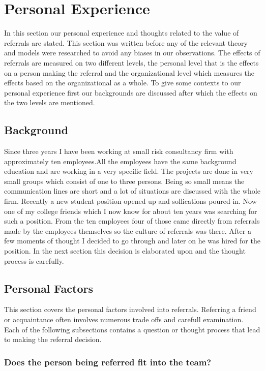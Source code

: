 \documentclass[a4paper, 11pt]{article} %
\begin{document}
\section*{Personal Experience}
In this section our personal experience and thoughts related to the value of referrals are stated. This section was written before any of the relevant theory and models were researched to avoid any biases in our observations. The effects of referrals are measured on two different levels, the personal level that is the effects on a person making the referral and the organizational level which measures the effects based on the organizational as a whole. To give some contexts to our personal experience first our backgrounds are discussed after which the effects on the two levels are mentioned.

\subsection*{Background}

 Since three years I have been working at small risk consultancy firm with approximately ten employees.All the employees have the same background education and are working in a very specific field. The projects are done in very small groups which consist of one to three persons. Being so small means the communication lines are short and a lot of situations are discussed with the whole firm. Recently a new student position opened up and sollications poured in.  Now one of my college friends which I now know for about ten years was searching for such a position. From the ten employees four of those came directly from referrals made by the employees themselves so the culture of referrals was there. After a few moments of thought I decided to go through and later on he was hired for the position. In the next section this decision is elaborated upon and the thought process is carefully. 

\subsection*{Personal Factors}

This section covers the personal factors involved into referrals. Referring a friend or acquaintance often involves numerous trade offs and carefull examination. Each of the following subsections contains a question or thought process that lead to making the referral decision.

\subsubsection*{Does the person being referred fit into the team?}
\end{document}

